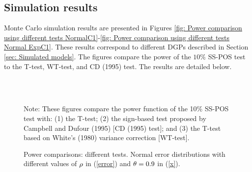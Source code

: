 \documentclass[harvard,11pt]{article}
\begin{document}
\subsection{Simulation results \label{sec: Simulation results}}

Monte Carlo simulation results are presented in Figures \ref{fig: Power
comparison using different tests NormalC1}-\ref{fig: Power comparison using different tests Normal ExpC1}. These results correspond to different DGPs
described in Section \ref{sec: Simulated models}. The figures compare the
power of the $10\%$ SS-POS test to the T-test, WT-test, and CD (1995) test. The results are detailed below. 
\begin{figure}[tbph]
\caption{Power comparisons: different tests. Normal error distributions with
different values of $\protect\rho $ in (\protect\ref{error}) and $\protect%
\theta =0.9$ in (\protect\ref{x}).}
\begin{center}
 \\[0pt]
\\[0pt]
\end{center}

Note: These figures compare the power
function of the 10\% SS-POS test with: (1) the T-test; (2) the sign-based test
proposed by Campbell and Dufour (1995) [CD (1995) test]; and (3) the T-test based
on White's (1980) variance correction [WT-test]. 
\label{fig: Power comparison using different tests NormalC1}
\end{figure}
\end{document}
